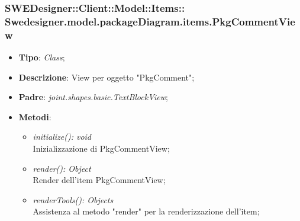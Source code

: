 \documentclass[../DefinizioneDiProdotto.tex]{subfiles}
\begin{document}
			\subsubsection[Swedesigner.model.packageDiagram.items.PkgCommentView]{SWEDesigner::Client::Model::Items::\\Swedesigner.model.packageDiagram.items.PkgCommentView}
			\hypertarget{SWEDesigner::Client::Model::Items::Swedesigner.model.packageDiagram.items.PkgCommentView}{}
			\begin{itemize}
				\item \textbf{Tipo}: \emph{Class};
				\item \textbf{Descrizione}: View per oggetto "PkgComment";
				\item \textbf{Padre}: \emph{joint.shapes.basic.TextBlockView};
				\item \textbf{Metodi}:
				\begin{itemize}
					\item \emph{initialize(): void}\\
					Inizializzazione di PkgCommentView;
					\item \emph{render(): Object}\\
					Render dell'item PkgCommentView;
					\item \emph{renderTools(): Objects}\\
					Assistenza al metodo "render" per la renderizzazione dell'item;
				\end{itemize}
			\end{itemize}
			
\end{document}
